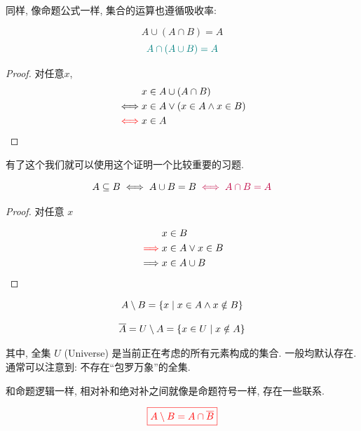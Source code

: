 同样, 像命题公式一样, 集合的运算也遵循吸收率: 

\begin{theorem}
    \[
      A \cup (A \cap B) = A
    \]
    \[
      \textcolor{teal}{A \cap (A \cup B) = A}
    \]
\end{theorem}

\begin{proof}
    对任意$x$,
    \begin{align*}
        &x \in A \cup (A \cap B) \\
        \iff & x \in A \lor (x \in A \land x \in B) \\
        \textcolor{red}{\iff} & x \in A
      \end{align*}
\end{proof}

有了这个我们就可以使用这个证明一个比较重要的习题. 

\begin{theorem}
    \[
      A \subseteq B \iff A \cup B = B \;\textcolor{purple}{\iff A \cap B = A}
    \]
  \end{theorem}
\begin{proof}
    
  对任意 $x$
    
  \setcounter{equation}{0}
  \begin{align*}
    &x \in B \\
    \textcolor{red}{\implies} &x \in A \lor x \in B \\
    \implies &x \in A \cup B
  \end{align*}
\end{proof}

\begin{definition}
  \[
    A \setminus B = \{x \mid x \in A \land x \notin B\}
  \]
\end{definition}

\begin{definition}
  \[
    \overline{A} = U \setminus A = \{x \in U \mid x \notin A\}
  \]

  其中, 全集 $U$ (Universe) 是当前正在考虑的所有元素构成的集合. 一般均默认存在. 通常可以注意到: 不存在``包罗万象''的全集. 
\end{definition}


和命题逻辑一样, 相对补和绝对补之间就像是命题符号一样, 存在一些联系. 

\begin{theorem}
  \[
    \textcolor{red}{\boxed{A \setminus B = A \cap \overline{B}}}
  \]
\end{theorem}


